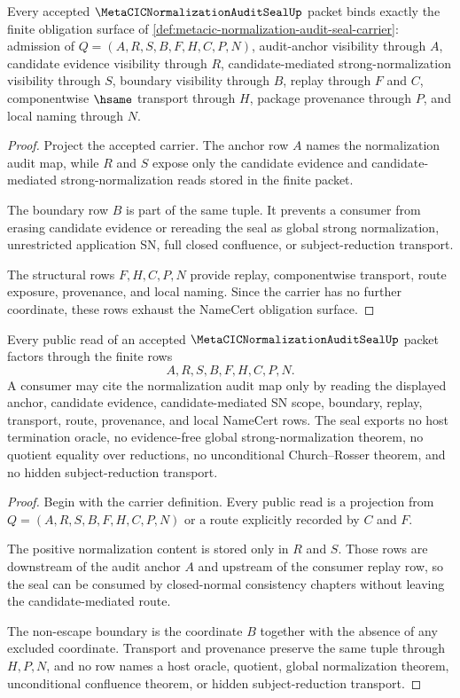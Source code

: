 \begin{theorem}
\label{thm:metacic-normalization-audit-seal-obligations}
Every accepted $\MetaCICNormalizationAuditSealUp$ packet binds exactly the finite obligation surface of \autoref{def:metacic-normalization-audit-seal-carrier}: admission of $Q=(A,R,S,B,F,H,C,P,N)$, audit-anchor visibility through $A$, candidate evidence visibility through $R$, candidate-mediated strong-normalization visibility through $S$, boundary visibility through $B$, replay through $F$ and $C$, componentwise $\hsame$ transport through $H$, package provenance through $P$, and local naming through $N$.
\end{theorem}
\begin{proof}
Project the accepted carrier. The anchor row $A$ names the normalization audit map, while $R$ and $S$ expose only the candidate evidence and candidate-mediated strong-normalization reads stored in the finite packet.

The boundary row $B$ is part of the same tuple. It prevents a consumer from erasing candidate evidence or rereading the seal as global strong normalization, unrestricted application SN, full closed confluence, or subject-reduction transport.

The structural rows $F,H,C,P,N$ provide replay, componentwise transport, route exposure, provenance, and local naming. Since the carrier has no further coordinate, these rows exhaust the NameCert obligation surface.
\end{proof}

\begin{theorem}
\label{thm:metacic-normalization-audit-seal-nonescape}
Every public read of an accepted $\MetaCICNormalizationAuditSealUp$ packet factors through the finite rows
$$
A,R,S,B,F,H,C,P,N.
$$
A consumer may cite the normalization audit map only by reading the displayed anchor, candidate evidence, candidate-mediated SN scope, boundary, replay, transport, route, provenance, and local NameCert rows. The seal exports no host termination oracle, no evidence-free global strong-normalization theorem, no quotient equality over reductions, no unconditional Church--Rosser theorem, and no hidden subject-reduction transport.
\end{theorem}
\begin{proof}
Begin with the carrier definition. Every public read is a projection from $Q=(A,R,S,B,F,H,C,P,N)$ or a route explicitly recorded by $C$ and $F$.

The positive normalization content is stored only in $R$ and $S$. Those rows are downstream of the audit anchor $A$ and upstream of the consumer replay row, so the seal can be consumed by closed-normal consistency chapters without leaving the candidate-mediated route.

The non-escape boundary is the coordinate $B$ together with the absence of any excluded coordinate. Transport and provenance preserve the same tuple through $H,P,N$, and no row names a host oracle, quotient, global normalization theorem, unconditional confluence theorem, or hidden subject-reduction transport.
\end{proof}

